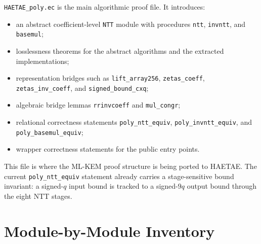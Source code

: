 \documentclass[11pt]{article}
\newcommand{\file}[1]{\texttt{#1}}
\newcommand{\ec}[1]{\texttt{#1}}
\begin{document}
\file{HAETAE\_poly.ec} is the main algorithmic proof file. It introduces:
\begin{itemize}[leftmargin=1.5em]
\item an abstract coefficient-level \ec{NTT} module with procedures
      \ec{ntt}, \ec{invntt}, and \ec{basemul};
\item losslessness theorems for the abstract algorithms and the extracted
      implementations;
\item representation bridges such as \ec{lift\_array256},
      \ec{zetas\_coeff}, \ec{zetas\_inv\_coeff}, and
      \ec{signed\_bound\_cxq};
\item algebraic bridge lemmas \ec{rrinvcoeff} and \ec{mul\_congr};
\item relational correctness statements
      \ec{poly\_ntt\_equiv}, \ec{poly\_invntt\_equiv}, and
      \ec{poly\_basemul\_equiv};
\item wrapper correctness statements for the public entry points.
\end{itemize}

This file is where the ML-KEM proof structure is being ported to HAETAE. The
current \ec{poly\_ntt\_equiv} statement already carries a stage-sensitive bound
invariant: a signed-$q$ input bound is tracked to a signed-$9q$ output bound
through the eight NTT stages.

\section{Module-by-Module Inventory}
\end{document}
